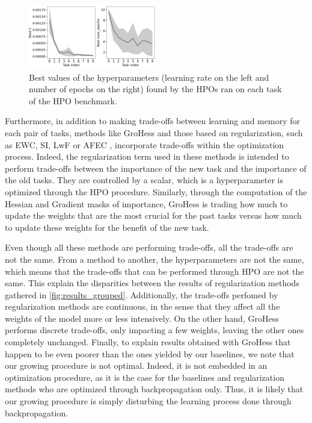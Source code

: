\documentclass[11pt]{article}
\begin{document}
\begin{figure}
    \centering
    \includegraphics[width=0.5\textwidth]{images/best_params.png}
    \caption{Best values of the hyperparameters (learning rate on the left and number of epochs on the right) found by the HPOs ran on each task of the HPO benchmark.}
    \label{fig:best_params}
\end{figure}

\vspace{2mm}
\noindent
Furthermore, in addition to making trade-offs between learning and memory for each pair of tasks, methods like GroHess and those based on regularization, such as EWC, SI, LwF or AFEC \cite{EWC_0}\cite{SI}\cite{LwF}\cite{afec}, incorporate trade-offs within the optimization process. Indeed, the regularization term used in these methods is intended to perform trade-offs between the importance of the new task and the importance of the old tasks. They are controlled by a scalar, which is a hyperparameter is optimized through the HPO procedure. Similarly, through the computation of the Hessian and Gradient masks of importance, GroHess is trading how much to update the weights that are the most crucial for the past tasks versus how much to update these weights for the benefit of the new task. 

\vspace{2mm}
\noindent
Even though all these methods are performing trade-offs, all the trade-offs are not the same. From a method to another, the hyperparameters are not the same, which means that the trade-offs that can be performed through HPO are not the same. This explain the disparities between the results of regularization methods gathered in \ref{fig:results_grouped}. Additionally, the trade-offs perfomed by regularization methods are continuous, in the sense that they affect all the weights of the model more or less intensively. On the other hand, GroHess performs discrete trade-offs, only impacting a few weights, leaving the other ones completely unchanged. Finally, to explain results obtained with GroHess that happen to be even poorer than the ones yielded by our baselines, we note that our growing procedure is not optimal. Indeed, it is not embedded in an optimization procedure, as it is the case for the baselines and regularization methods who are optimized through backpropagation only. Thus, it is likely that our growing procedure is simply disturbing the learning process done through backpropagation.
\end{document}
